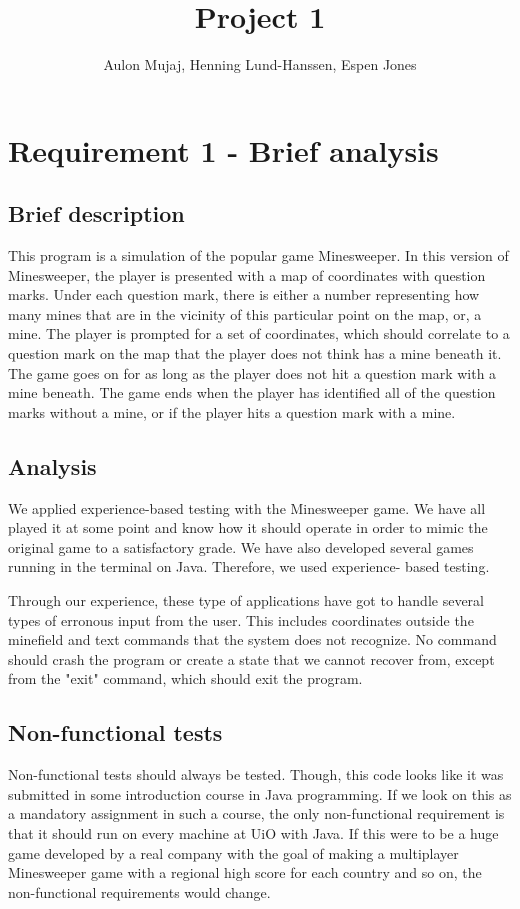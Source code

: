 \documentclass[UKenglish]{article}  %
\title{Project 1}        %
\author{Aulon Mujaj, Henning Lund-Hanssen, Espen Jones}                      %
\begin{document}
\maketitle{}

\section{Requirement 1 - Brief analysis}

\subsection{Brief description}
This program is a simulation of the popular game Minesweeper. In this version of
Minesweeper, the player is presented with a map of coordinates with
question marks. Under each question mark, there is either a number representing
how many mines that are in the vicinity of this particular point on the map, or,
a mine. The player is prompted for a set of coordinates, which should correlate
to a question mark on the map that the player does not think has a mine beneath
it. The game goes on for as long as the player does not hit a question mark with
a mine beneath. The game ends when the player has identified all of the
question marks without a mine, or if the player hits a question mark with a mine.

\subsection{Analysis} We applied experience-based testing with the Minesweeper
game. We have all played it at some point and know how it should operate in
order to mimic the original game to a satisfactory grade. We have also developed
several games running in the terminal on Java. Therefore, we used experience-
based testing.

Through our experience, these type of applications have got to handle several
types of erronous input from the user. This includes coordinates outside the
minefield and text commands that the system does not recognize. No command
should crash the program or create a state that we cannot recover from, except
from the "exit" command, which should exit the program.

\subsection{Non-functional tests} Non-functional tests should always be tested.
Though, this code looks like it was submitted in some introduction course in
Java programming. If we look on this as a mandatory assignment in such a course,
the only non-functional requirement is that it should run on every machine at
UiO with Java. If this were to be a huge game developed by a real company with
the goal of making a multiplayer Minesweeper game with a regional high score for
each country and so on, the non-functional requirements would change.
\end{document}
